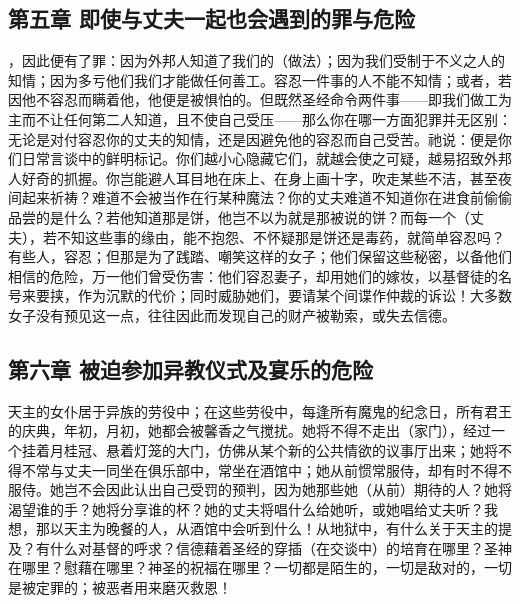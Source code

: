
\subsection{第五章 即使与丈夫一起也会遇到的罪与危险}

，因此便有了罪：因为外邦人知道了我们的（做法）；因为我们受制于不义之人的知情；因为多亏他们我们才能做任何善工。容忍一件事的人不能不知情；或者，若因他不容忍而瞒着他，他便是被惧怕的。但既然圣经命令两件事——即我们做工为主而不让任何第二人知道，且不使自己受压——那么你在哪一方面犯罪并无区别：无论是对付容忍你的丈夫的知情，还是因避免他的容忍而自己受苦。祂说：便是你们日常言谈中的鲜明标记。你们越小心隐藏它们，就越会使之可疑，越易招致外邦人好奇的抓握。你岂能避人耳目地在床上、在身上画十字，吹走某些不洁，甚至夜间起来祈祷？难道不会被当作在行某种魔法？你的丈夫难道不知道你在进食前偷偷品尝的是什么？若他知道那是饼，他岂不以为就是那被说的饼？而每一个（丈夫），若不知这些事的缘由，能不抱怨、不怀疑那是饼还是毒药，就简单容忍吗？有些人，容忍；但那是为了践踏、嘲笑这样的女子；他们保留这些秘密，以备他们相信的危险，万一他们曾受伤害：他们容忍妻子，却用她们的嫁妆，以基督徒的名号来要挟，作为沉默的代价；同时威胁她们，要请某个间谍作仲裁的诉讼！大多数女子没有预见这一点，往往因此而发现自己的财产被勒索，或失去信德。\par


\subsection{第六章 被迫参加异教仪式及宴乐的危险}

天主的女仆居于异族的劳役中；在这些劳役中，每逢所有魔鬼的纪念日，所有君王的庆典，年初，月初，她都会被馨香之气搅扰。她将不得不走出（家门），经过一个挂着月桂冠、悬着灯笼的大门，仿佛从某个新的公共情欲的议事厅出来；她将不得不常与丈夫一同坐在俱乐部中，常坐在酒馆中；她从前惯常服侍，却有时不得不服侍。她岂不会因此认出自己受罚的预判，因为她那些她（从前）期待的人？她将渴望谁的手？她将分享谁的杯？她的丈夫将唱什么给她听，或她唱给丈夫听？我想，那以天主为晚餐的人，从酒馆中会听到什么！从地狱中，有什么关于天主的提及？有什么对基督的呼求？信德藉着圣经的穿插（在交谈中）的培育在哪里？圣神在哪里？慰藉在哪里？神圣的祝福在哪里？一切都是陌生的，一切是敌对的，一切是被定罪的；被恶者用来磨灭救恩！\par

